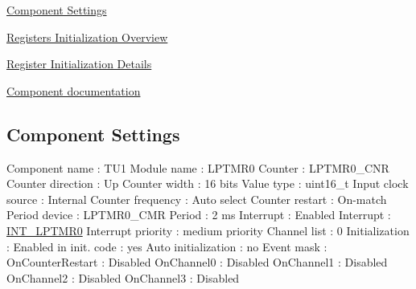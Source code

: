 \begin{DoxyItemize}
\item \hyperlink{TU1_settings}{Component Settings}
\item \hyperlink{TU1_regs_overview}{Registers Initialization Overview}
\item \hyperlink{TU1_regs_details}{Register Initialization Details}
\item \hyperlink{group___t_u1__module}{Component documentation} 
\end{DoxyItemize}\hypertarget{TU1_settings}{}\subsection{Component Settings}\label{TU1_settings}

\begin{DoxyCode}
            Component name                                 : TU1
            Module name                                    : LPTMR0
            Counter                                        : LPTMR0\_CNR
            Counter direction                              : Up
            Counter width                                  : 16 bits
            Value type                                     : uint16\_t
            Input clock source                             : Internal
              Counter frequency                            : Auto select
            Counter restart                                : On-match
              Period device                                : LPTMR0\_CMR
              Period                                       : 2 ms
              Interrupt                                    : Enabled
                Interrupt                                  : \hyperlink{group___interrupt__vector__numbers_gga5f3656e2a154b64aa378a2f3856c3a8dadb33151c23fc4df6fa87f60d1df02dae}{INT\_LPTMR0}
                Interrupt priority                         : medium priority
            Channel list                                   : 0
            Initialization                                 : 
              Enabled in init. code                        : yes
              Auto initialization                          : no
              Event mask                                   : 
                OnCounterRestart                           : Disabled
                OnChannel0                                 : Disabled
                OnChannel1                                 : Disabled
                OnChannel2                                 : Disabled
                OnChannel3                                 : Disabled

\end{DoxyCode}
